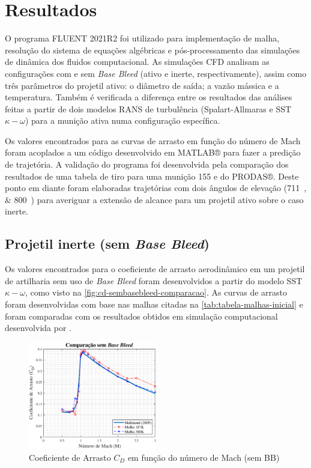 \chapter{Resultados}\label{cap:resultados}
\graphicspath{{chapter-07/img-cap07/}}

O programa FLUENT 2021R2 \cite{fluent2021ansys} foi utilizado para implementação de malha, resolução do sistema de equações algébricas e pós-processamento das simulações de dinâmica dos fluidos computacional. As simulações CFD analisam as configurações com e sem \textit{Base Bleed} (ativo e inerte, respectivamente), assim como três parâmetros do projetil ativo: o diâmetro de saída; a vazão mássica e a temperatura. Também é verificada a diferença entre os resultados das análises feitas a partir de dois modelos RANS de turbulência (Spalart-Allmaras e SST \(\kappa-\omega\)) para a munição ativa numa configuração específica.

Os valores encontrados para as curvas de arrasto em função do número de Mach foram acoplados a um código desenvolvido em MATLAB® para fazer a predição de trajetória. A validação do programa foi desenvolvida pela comparação dos resultados de uma tabela de tiro para uma munição \qty{155}{\millimetre} e do PRODAS®. Deste ponto em diante foram elaboradas trajetórias com dois ângulos de elevação (\qtylist{711;800}{\milliradian}) para averiguar a extensão de alcance para um projetil ativo sobre o caso inerte.

\section{Projetil inerte (sem \textit{Base Bleed})}\label{sec:resultados-sem-basebleed}

Os valores encontrados para o coeficiente de arrasto aerodinâmico em um projetil de artilharia sem uso de \textit{Base Bleed} foram desenvolvidos a partir do modelo SST \(\kappa-\omega\), como visto na \autoref{fig:cd-sembasebleed-comparacao}. As curvas de arrasto foram desenvolvidas com base nas malhas citadas na \autoref{tab:tabela-malhas-inicial} e foram comparadas com os resultados obtidos em simulação computacional desenvolvida por \citeauthor{Mahmoud2009}. 

\begin{figure}[!htpb]
	\centering
	\includegraphics[width=0.5\textwidth]{cd-sembasebleed-comparacao.eps}
	\caption{Coeficiente de Arrasto \(C_{D}\) em função do número de Mach (sem BB)}
	\label{fig:cd-sembasebleed-comparacao}
\end{figure}

